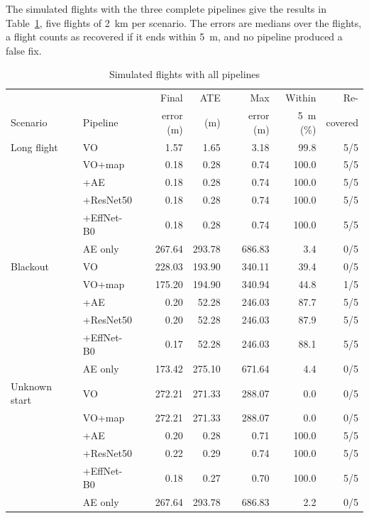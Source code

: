 \documentclass[english, Lau, oneside]{sapthesis}%
\begin{document}
The simulated flights with the three complete pipelines give the results in Table~\ref{tab:reloc-all-sim}, five flights of 2~km per scenario. The errors are medians over the flights, a flight counts as recovered if it ends within 5~m, and no pipeline produced a false fix.

\begin{table}[!htbp]
  \centering
  \caption{Simulated flights with all pipelines}
  \label{tab:reloc-all-sim}
  \small\setlength{\tabcolsep}{3.5pt}
  \begin{tabular}{llrrrrr}
    \toprule
    & & Final & ATE & Max & Within & Re- \\
    Scenario & Pipeline & error (m) & (m) & error (m) & 5~m (\%) & covered \\
    \midrule
    Long flight & VO & 1.57 & 1.65 & 3.18 & 99.8 & 5/5 \\
     & VO+map & 0.18 & 0.28 & 0.74 & 100.0 & 5/5 \\
     & +AE & 0.18 & 0.28 & 0.74 & 100.0 & 5/5 \\
     & +ResNet50 & 0.18 & 0.28 & 0.74 & 100.0 & 5/5 \\
     & +EffNet-B0 & 0.18 & 0.28 & 0.74 & 100.0 & 5/5 \\
     & AE only & 267.64 & 293.78 & 686.83 & 3.4 & 0/5 \\
    \addlinespace
    Blackout & VO & 228.03 & 193.90 & 340.11 & 39.4 & 0/5 \\
     & VO+map & 175.20 & 194.90 & 340.94 & 44.8 & 1/5 \\
     & +AE & 0.20 & 52.28 & 246.03 & 87.7 & 5/5 \\
     & +ResNet50 & 0.20 & 52.28 & 246.03 & 87.9 & 5/5 \\
     & +EffNet-B0 & 0.17 & 52.28 & 246.03 & 88.1 & 5/5 \\
     & AE only & 173.42 & 275.10 & 671.64 & 4.4 & 0/5 \\
    \addlinespace
    Unknown start & VO & 272.21 & 271.33 & 288.07 & 0.0 & 0/5 \\
     & VO+map & 272.21 & 271.33 & 288.07 & 0.0 & 0/5 \\
     & +AE & 0.20 & 0.28 & 0.71 & 100.0 & 5/5 \\
     & +ResNet50 & 0.22 & 0.29 & 0.74 & 100.0 & 5/5 \\
     & +EffNet-B0 & 0.18 & 0.27 & 0.70 & 100.0 & 5/5 \\
     & AE only & 267.64 & 293.78 & 686.83 & 2.2 & 0/5 \\
    \bottomrule
  \end{tabular}
\end{table}
\end{document}
